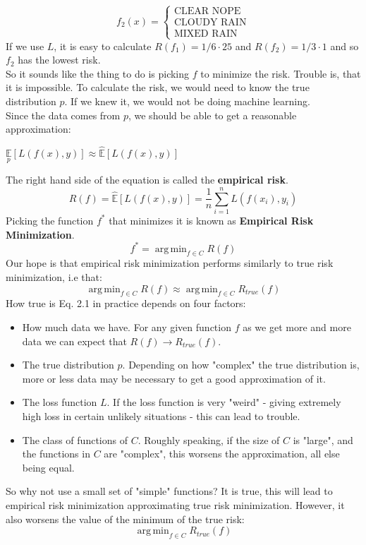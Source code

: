 \documentclass[twoside]{article}
\DeclareMathOperator*{\argmin}{arg\,min}
\begin{document}
\begin{equation*}
    f_2(x) = \begin{cases}
        \text{CLEAR NOPE} \\
        \text{CLOUDY RAIN} \\
        \text{MIXED RAIN} 
    \end{cases}
\end{equation*}
If we use $L$, it is easy to calculate $R(f_1) = 1/6\cdot25$ and $R(f_2) = 1/3\cdot1$ and so $f_2$ has the lowest risk.\\
So it sounds like the thing to do is picking $f$ to minimize the risk. Trouble is, that it is impossible.
To calculate the risk, we would need to know the true distribution $p$. If we knew it, we would not be doing machine learning.\\
Since the data comes from $p$, we should be able to get a reasonable approximation:
\begin{center}
    $\underset{p}{\mathbb{E}}[L(f(x), y)] \approx \hat{\mathbb{E}}[L(f(x), y)]$
\end{center}
The right hand side of the equation is called the \textbf{empirical risk}.
\begin{equation*}
    R(f) = \hat{\mathbb{E}}[L(f(x), y)] = \frac{1}{n}\sum\limits_{i = 1}^{n}L(f(x_i), y_i)
\end{equation*}
Picking the function $f^*$ that minimizes it is known as \textbf{Empirical Risk Minimization}.
\begin{equation*}
    f^* = \argmin_{f \in C} R(f)
\end{equation*}
Our hope is that empirical risk minimization performs similarly to true risk minimization, i.e that:
\begin{equation}
    \argmin_{f \in C} R(f) \approx \argmin_{f \in C} R_{true}(f)
\end{equation}
\newpage
How true is Eq. 2.1 in practice depends on four factors:
\begin{itemize}
    \item How much data we have. For any given function $f$ as we get more and more data we can expect that $R(f) \to R_{true}(f)$.
    \item The true distribution $p$. Depending on how "complex" the true distribution is, more or less data may be necessary to get a good approximation of it.
    \item The loss function $L$. If the loss function is very "weird" - giving extremely high loss in certain unlikely situations - this can lead to trouble.
    \item The class of functions of $C$. Roughly speaking, if the size of $C$ is "large", and the functions in $C$ are "complex", this worsens the approximation, all else being equal.
\end{itemize}
So why not use a small set of "simple" functions? It is true, this will lead to empirical risk minimization approximating true risk minimization. However, it also worsens the value of the minimum of the true risk:
\begin{equation*}
    \argmin_{f \in C} R_{true}(f)
\end{equation*}
\end{document}
